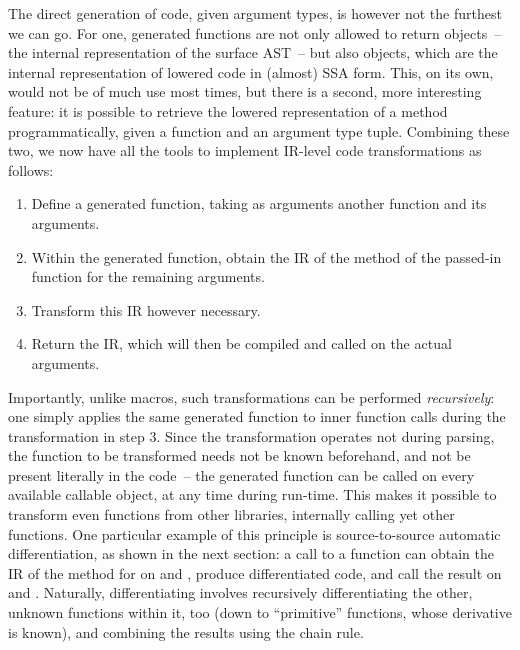 The direct generation of code, given argument types, is however not the furthest we can go.  For
one, generated functions are not only allowed to return  objects~-- the internal
representation of the surface AST~-- but also  objects, which are the internal
representation of lowered code in (almost) SSA form.  This, on its own, would not be of much use
most times, but there is a second, more interesting feature: it is possible to retrieve the lowered
representation of a method programmatically, given a function and an argument type tuple.  Combining
these two, we now have all the tools to implement IR-level code transformations as follows:
\begin{enumerate}
  \firmlist
\item Define a generated function, taking as arguments another function and its arguments.
\item Within the generated function, obtain the IR of the method of the passed-in function for the
  remaining arguments.
\item Transform this IR however necessary.
\item Return the IR, which will then be compiled and called on the actual arguments.
\end{enumerate}
Importantly, unlike macros, such transformations can be performed \emph{recursively}: one simply
applies the same generated function to inner function calls during the transformation in step 3.
Since the transformation operates not during parsing, the function to be transformed needs not be
known beforehand, and not be present literally in the code~-- the generated function can be called
on every available callable object, at any time during run-time.  This makes it possible to
transform even functions from other libraries, internally calling yet other functions.  One
particular example of this principle is source-to-source automatic differentiation, as shown in the
next section: a call to a function  can obtain the IR of the method for
 on  and , produce differentiated code, and call the
result on  and .  Naturally, differentiating  involves recursively
differentiating the other, unknown functions within it, too (down to \enquote{primitive} functions,
whose derivative is known), and combining the results using the chain rule.

